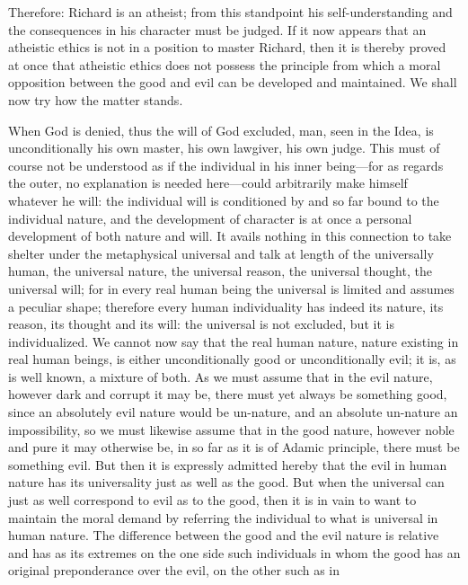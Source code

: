 \documentclass[12pt,a4paper,openany]{book}
\newcommand{\opage}[1]{\marginnote{\footnotesize\textit{[#1]}}}
\begin{document}
Therefore: Richard is an atheist; from this standpoint
his self-understanding and the consequences in his character
must be judged. If it now appears that an atheistic
ethics is not in a position to master Richard, then it is
thereby proved at once that atheistic ethics does not
possess the principle from which a moral opposition between
the good and evil can be developed and maintained. We
shall now try how the matter stands.

When God is denied, thus the will of God excluded,
man, seen in the Idea, is unconditionally his own
master, his own lawgiver, his own judge. This
\setcounter{footnote}{0}%
\opage{536}must of course not be understood as if the individual in his
inner being---for as regards the outer, no
explanation is needed here---could arbitrarily make himself
whatever he will: the individual will is conditioned by and so far
bound to the individual nature, and the development of character
is at once a personal development of both
nature and will. It avails nothing in this connection to
take shelter under the metaphysical universal and talk at
length of the universally human, the universal nature,
the universal reason, the universal thought, the universal will;
for in every real human being the universal is limited
and assumes a peculiar shape; therefore
every human individuality has indeed its nature, its reason,
its thought and its will: the universal is not excluded,
but it is individualized. We cannot now
say that the real human nature, nature existing
in real human beings, is either unconditionally good
or unconditionally evil; it is, as is well known, a mixture
of both. As we must assume that in the evil nature,
however dark and corrupt it may be, there must yet always
be something good, since an absolutely evil nature would
be un-nature, and an absolute un-nature an impossibility, so
we must likewise assume that in the good nature,
however noble and pure it may otherwise be, in so far as
it is of Adamic principle, there must be something evil.
But then it is expressly admitted hereby that the evil
in human nature has its universality just as well as
the good. But when the universal can just as well
correspond to evil as to the good, then it is in vain
to want to maintain the moral demand by referring
the individual to what is universal in human nature.
\setcounter{footnote}{0}%
\opage{537}The difference between the good and the evil nature is relative
and has as its extremes on the one side such
individuals in whom the good has an original preponderance
over the evil, on the other such as in
\end{document}
